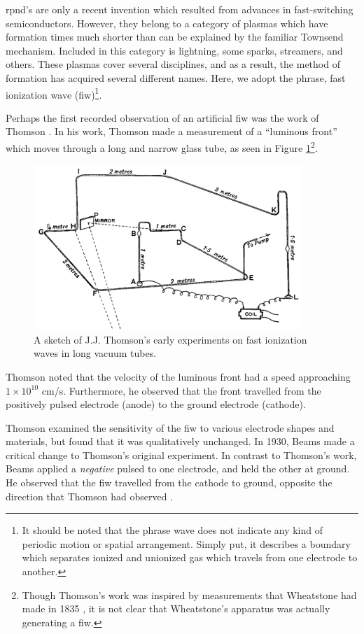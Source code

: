 \acs{rpnd}'s are only a recent invention which resulted from advances in
fast-switching semiconductors. However, they belong to a category of plasmas
which have formation times much shorter than can be explained by the familiar
Townsend mechanism. Included in this category is lightning, some sparks,
streamers, and others. These plasmas cover several disciplines, and as a result,
the method of formation has acquired several different names. Here, we adopt the
phrase, fast ionization wave (\acs{fiw})\footnote{It should be noted that the
phrase wave does not indicate any kind of periodic motion or spatial
arrangement. Simply put, it describes a boundary which separates ionized and
unionized gas which travels from one electrode to another.}.

Perhaps the first recorded observation of an artificial \acs{fiw} was the work
of Thomson \cite{Thomson1893}. In his work, Thomson made a measurement of a
``luminous front'' which moves through a long and narrow glass tube, as seen in
Figure \ref{fig:thomson}\footnote{Though Thomson's work was inspired by
measurements that Wheatstone had made in 1835 \cite{Wheatstone1835}, it is not
clear that Wheatstone's apparatus was actually generating a \acs{fiw}.}.
\begin{figure}
  \centering
  \includegraphics[width=4in]{chapters/introduction/figures/thomson.png}
  \caption{A sketch of J.J. Thomson's early experiments on fast ionization
  waves in long vacuum tubes.}\label{fig:thomson}
\end{figure}
Thomson noted that the velocity of the luminous front had a speed approaching
$1\times10^{10}$ cm/s. Furthermore, he observed that the front travelled from
the positively pulsed electrode (anode) to the ground electrode (cathode).

Thomson examined the sensitivity of the \acs{fiw} to various electrode shapes
and materials, but found that it was qualitatively unchanged. In 1930, Beams
made a critical change to Thomson's original experiment. In contrast to
Thomson's work, Beams applied a \emph{negative} pulsed to one electrode, and
held the other at ground. He observed that the \acs{fiw} travelled from the
cathode to ground, opposite the direction that Thomson had observed
\cite{Beams1930}.

